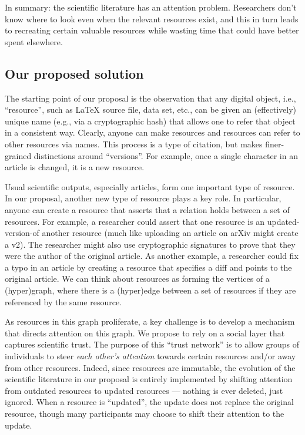 \documentclass{article} %
\begin{document}
In summary: the scientific literature has an attention problem. Researchers don't know where to look even when the relevant resources exist, and this in turn leads to recreating certain valuable resources while wasting time that could have better spent elsewhere.

\subsection{Our proposed solution}

The starting point of our proposal is the observation that any digital object, i.e., ``resource'',
such as \LaTeX{} source file, data set, etc., can be given an (effectively) unique name (e.g., via a cryptographic hash) 
that allows one to refer that object in a consistent way. 
Clearly, anyone can make resources and resources can refer to other resources via names. 
This process is a type of citation, 
but makes finer-grained distinctions around ``versions''. 
For example, once a single character in an article is changed, it is a new resource. 

Usual scientific outputs, especially articles, form one important type of resource.
In our proposal, another new type of resource plays a key role. 
In particular, anyone can create a resource that asserts that a relation holds between a set of resources. 
For example, a researcher could assert that one resource is an updated-version-of another resource (much like uploading an article on arXiv might create a v2). 
The researcher might also use cryptographic signatures to prove that they were the author of the original article.
As another example, a researcher could fix a typo in an article by creating a resource that specifies a diff and points to the original article.
We can think about resources as forming the vertices of a (hyper)graph, where there is a (hyper)edge between a set of resources if they are referenced by the same resource.

As resources in this graph proliferate, a key challenge is to
develop a mechanism that directs attention on this graph.
We propose to rely on a social layer 
that captures scientific trust. 
The purpose of this ``trust network''
is to allow groups of individuals to steer \emph{each other's attention} towards certain resources and/or away from other resources.
Indeed, since resources are immutable, the evolution of the scientific literature in our proposal
is entirely implemented by shifting attention from outdated resources to updated resources --- nothing is ever deleted, just ignored. When a resource is ``updated'', the update does not replace the original resource, though many participants may choose to shift their attention to the update.
\end{document}

